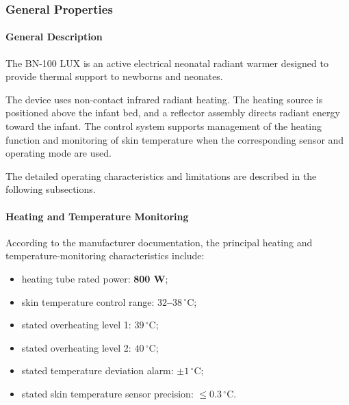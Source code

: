﻿

\hypertarget{p3-2-1-2}{}

\subsubsection{General Properties}


\paragraph{General Description}

The BN-100 LUX is an active electrical neonatal radiant warmer
designed to provide thermal support to newborns and neonates.

The device uses non-contact infrared radiant heating. The heating
source is positioned above the infant bed, and a reflector assembly
directs radiant energy toward the infant. The control system
supports management of the heating function and monitoring of
skin temperature when the corresponding sensor and operating mode
are used.

The detailed operating characteristics and limitations are
described in the following subsections.


\paragraph{Heating and Temperature Monitoring}

According to the manufacturer documentation, the principal
heating and temperature-monitoring characteristics include:

\begin{itemize}
    \item heating tube rated power: \textbf{800 W};
    \item skin temperature control range:
    \textbf{$32$--$38\,^{\circ}\mathrm{C}$};
    \item stated overheating level 1:
    \textbf{$39\,^{\circ}\mathrm{C}$};
    \item stated overheating level 2:
    \textbf{$40\,^{\circ}\mathrm{C}$};
    \item stated temperature deviation alarm:
    \textbf{$\pm 1\,^{\circ}\mathrm{C}$};
    \item stated skin temperature sensor precision:
    \textbf{$\leq 0.3\,^{\circ}\mathrm{C}$}.
\end{itemize}

